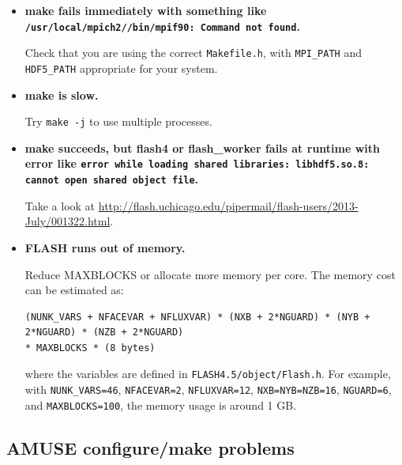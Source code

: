 \documentclass[10pt]{article}
\begin{document}
\begin{itemize}

    \item \textbf{make fails immediately with something like
        \texttt{/usr/local/mpich2//bin/mpif90: Command not found}.}

        Check that you are using the correct \texttt{Makefile.h}, with
        \texttt{MPI\_PATH} and \texttt{HDF5\_PATH} appropriate for your system.

    \item \textbf{make is slow.}

        Try \texttt{make -j} to use multiple processes.

    \item \textbf{make succeeds, but flash4 or flash\_worker fails at runtime with
        error like \texttt{error while loading shared libraries: libhdf5.so.8:
        cannot open shared object file}.}

        Take a look at \url{http://flash.uchicago.edu/pipermail/flash-users/2013-July/001322.html}.

    \item \textbf{FLASH runs out of memory.}

        Reduce MAXBLOCKS or allocate more memory per core.
        The memory cost can be estimated as:
\begin{verbatim}
(NUNK_VARS + NFACEVAR + NFLUXVAR) * (NXB + 2*NGUARD) * (NYB + 2*NGUARD) * (NZB + 2*NGUARD)
* MAXBLOCKS * (8 bytes)
\end{verbatim}
        where the variables are defined in \texttt{FLASH4.5/object/Flash.h}.
        For example, with \texttt{NUNK\_VARS=46}, \texttt{NFACEVAR=2},
        \texttt{NFLUXVAR=12}, \texttt{NXB=NYB=NZB=16}, \texttt{NGUARD=6}, and
        \texttt{MAXBLOCKS=100}, the memory usage is around 1 GB.

\end{itemize}

\subsection{AMUSE configure/make problems}
\label{sec:help-amuse}
\end{document}
